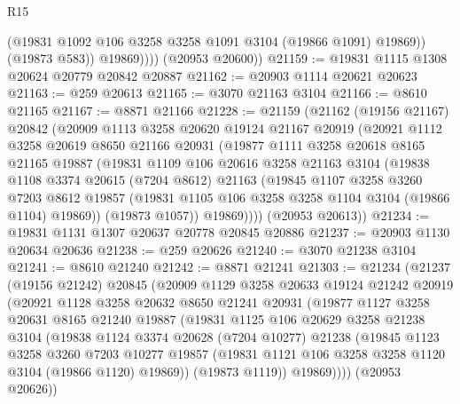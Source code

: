 \begin{lexlean}{R15}
\begin{coremodule}
                  (@19831 @1092 @106 @3258 @3258 @1091 @3104 (@19866 @1091) @19869))
                (@19873 @583))
              @19869))))
      (@20953 @20600))
@21159 := @19831 @1115 @1308 @20624 @20779 @20842 @20887
@21162 := @20903 @1114 @20621 @20623
@21163 := @259 @20613
@21165 := @3070 @21163 @3104
@21166 := @8610 @21165
@21167 := @8871 @21166
@21228 := @21159
    (@21162
      (@19156 @21167)
      @20842
      (@20909
        @1113
        @3258
        @20620
        @19124
        @21167
        @20919
        (@20921
          @1112
          @3258
          @20619
          @8650
          @21166
          @20931
          (@19877
            @1111
            @3258
            @20618
            @8165
            @21165
            @19887
            (@19831
              @1109
              @106
              @20616
              @3258
              @21163
              @3104
              (@19838
                @1108
                @3374
                @20615
                (@7204 @8612)
                @21163
                (@19845
                  @1107
                  @3258
                  @3260
                  @7203
                  @8612
                  @19857
                  (@19831 @1105 @106 @3258 @3258 @1104 @3104 (@19866 @1104) @19869))
                (@19873 @1057))
              @19869))))
      (@20953 @20613))
@21234 := @19831 @1131 @1307 @20637 @20778 @20845 @20886
@21237 := @20903 @1130 @20634 @20636
@21238 := @259 @20626
@21240 := @3070 @21238 @3104
@21241 := @8610 @21240
@21242 := @8871 @21241
@21303 := @21234
    (@21237
      (@19156 @21242)
      @20845
      (@20909
        @1129
        @3258
        @20633
        @19124
        @21242
        @20919
        (@20921
          @1128
          @3258
          @20632
          @8650
          @21241
          @20931
          (@19877
            @1127
            @3258
            @20631
            @8165
            @21240
            @19887
            (@19831
              @1125
              @106
              @20629
              @3258
              @21238
              @3104
              (@19838
                @1124
                @3374
                @20628
                (@7204 @10277)
                @21238
                (@19845
                  @1123
                  @3258
                  @3260
                  @7203
                  @10277
                  @19857
                  (@19831 @1121 @106 @3258 @3258 @1120 @3104 (@19866 @1120) @19869))
                (@19873 @1119))
              @19869))))
      (@20953 @20626))

\end{coremodule}
\end{lexlean}
